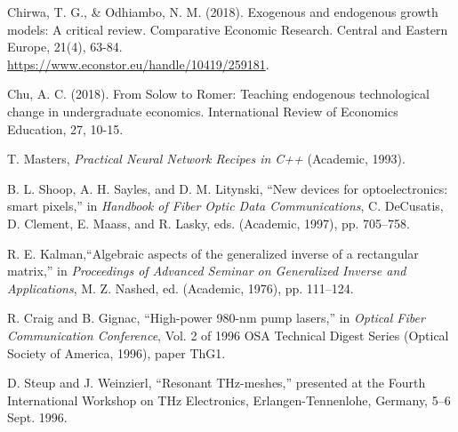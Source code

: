 \documentclass[letterpaper, 10pt]{article}
\begin{document}
\begin{thebibliography}{99} %



Chirwa, T. G., \& Odhiambo, N. M. (2018). Exogenous and endogenous growth models: A critical review. Comparative Economic Research. Central and Eastern Europe, 21(4), 63-84.\\
\url{https://www.econstor.eu/handle/10419/259181}.

Chu, A. C. (2018). From Solow to Romer: Teaching endogenous technological change in undergraduate economics. International Review of Economics Education, 27, 10-15.


 T. Masters, \emph{Practical Neural Network Recipes in C++} (Academic, 1993).

 B. L. Shoop, A. H. Sayles, and D. M. Litynski, ``New devices for optoelectronics: smart pixels,''
in \emph{Handbook of Fiber Optic Data Communications},
C. DeCusatis, D. Clement, E. Maass, and R. Lasky, eds. (Academic, 1997), pp. 705--758.

 R. E. Kalman,``Algebraic aspects of the generalized inverse of a rectangular matrix,'' in
\emph{Proceedings of Advanced Seminar on Generalized Inverse and Applications}, M. Z. Nashed, ed. (Academic, 1976), pp. 111--124.

 R. Craig and B. Gignac, ``High-power 980-nm pump lasers,''
in \emph{Optical Fiber Communication Conference}, Vol. 2 of 1996 OSA Technical Digest Series (Optical Society of America, 1996), paper ThG1.

 D. Steup and J. Weinzierl, ``Resonant THz-meshes,''
presented at the Fourth International Workshop on THz Electronics, Erlangen-Tennenlohe, Germany, 5--6 Sept. 1996.

\end{thebibliography}
\end{document}
